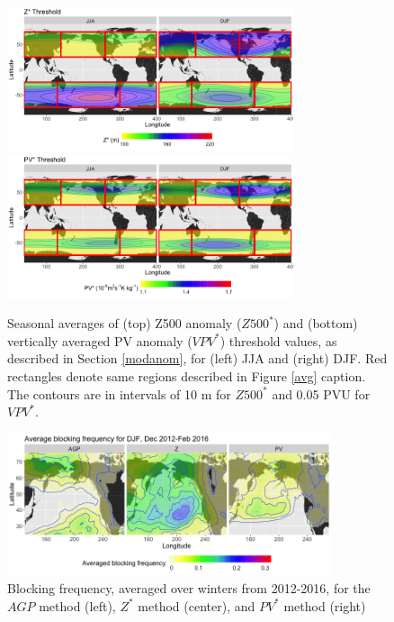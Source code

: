 \documentclass[smallextended]{svjour3}       %
\numberwithin{equation}{section}
\begin{document}
\begin{figure}
\centering
\includegraphics[width=0.75\textwidth]{fig3a}
\includegraphics[width=0.75\textwidth]{fig3b}
\caption{Seasonal averages of (top) Z500 anomaly ($Z500^*$) and (bottom) vertically averaged PV anomaly ($VPV^*$) threshold values, as described in Section \ref{modanom}, for (left) JJA and (right) DJF. Red rectangles denote same regions described in Figure \ref{avg} caption. The contours are in intervals of 10 m for $Z500^*$ and 0.05 PVU for $VPV^*$.}\label{thresh}
\end{figure}

\begin{figure}
\centering
\includegraphics[width=0.85\textwidth]{fig4}
\caption{Blocking frequency, averaged over winters from 2012-2016, for the $AGP$ method (left), $Z^*$ method (center), and $PV^*$ method (right)}\label{RRRFreq}
\end{figure}
\end{document}

